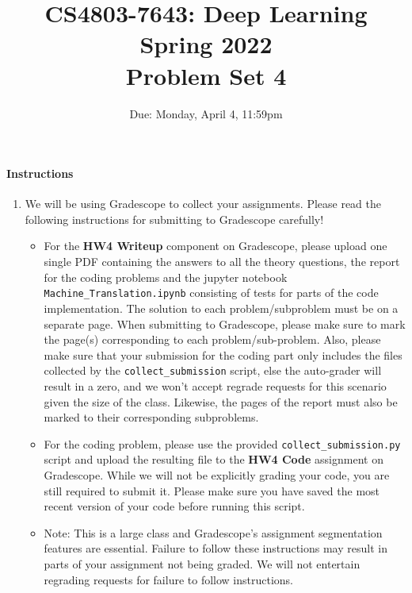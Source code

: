 \documentclass[11pt,english]{article}
\begin{document}
\title{CS4803-7643: Deep Learning\\
Spring 2022 \\
Problem Set 4}


\date{Due: Monday, April 4, 11:59pm}
\maketitle



\paragraph*{Instructions}
\begin{enumerate}
\item We will be using Gradescope to collect your assignments.  Please read the following instructions for submitting to Gradescope carefully!
     \begin{itemize}
          \item 
                For the \textbf{HW4 Writeup} component on Gradescope, please upload one single PDF containing the answers to all the theory questions, the report for the coding problems and the jupyter notebook \texttt{Machine\_Translation.ipynb} consisting of tests for parts of the code implementation. The solution to each problem/subproblem must be on a separate page. When submitting to Gradescope, please make sure to mark the page(s) corresponding to each problem/sub-problem.  
                Also, please make sure that your submission for the coding part only includes the files collected by the \texttt{collect\_submission} script, else the auto-grader will result in a zero, and we won't accept regrade requests for this scenario given the size of the class.
                Likewise, the pages of the report must also be marked to their corresponding subproblems. 

          \item
               For the coding problem, please use the provided \texttt{collect\_submission.py} script and
               upload the resulting file to the \textbf{HW4 Code} assignment on Gradescope. While we will
               not be explicitly grading your code, you are still required to submit it. Please make sure
               you have saved the most recent version of your code before running this
               script.

          \item
               Note: This is a large class and Gradescope's assignment segmentation features are essential.
               Failure to follow these instructions may result in parts of your assignment not being graded.
               We will not entertain regrading requests for failure to follow instructions.



\end{itemize}
\end{enumerate}
\end{document}
